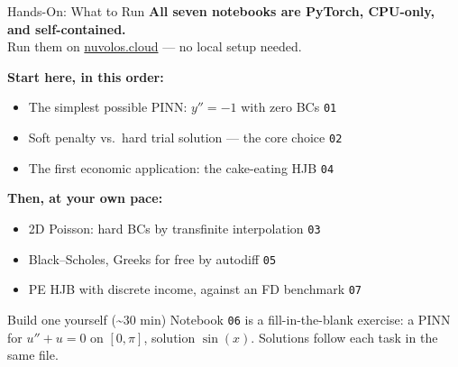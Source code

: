 \documentclass[aspectratio=169,11pt]{beamer}
\begin{document}
\begin{frame}{Hands-On: What to Run}
\textbf{All seven notebooks are PyTorch, CPU-only, and self-contained.}\\[2pt]
{\footnotesize Run them on \href{https://nuvolos.cloud}{nuvolos.cloud} --- no local setup needed.}

\vspace{0.4em}
\textbf{Start here, in this order:}
\begin{itemize}\setlength\itemsep{1pt}
    \item The simplest possible PINN: $y''=-1$ with zero BCs \hfill{\footnotesize\texttt{01}}
    \item Soft penalty vs.\ hard trial solution --- the core choice \hfill{\footnotesize\texttt{02}}
    \item The first economic application: the cake-eating HJB \hfill{\footnotesize\texttt{04}}
\end{itemize}

\vspace{0.3em}
\textbf{Then, at your own pace:}
\begin{itemize}\setlength\itemsep{1pt}
    \item 2D Poisson: hard BCs by transfinite interpolation \hfill{\footnotesize\texttt{03}}
    \item Black--Scholes, Greeks for free by autodiff \hfill{\footnotesize\texttt{05}}
    \item PE HJB with discrete income, against an FD benchmark \hfill{\footnotesize\texttt{07}}
\end{itemize}

\vspace{0.1em}
\begin{exampleblock}{Build one yourself (\textasciitilde30 min)}
\footnotesize
Notebook \texttt{06} is a fill-in-the-blank exercise: a PINN for $u''+u=0$ on $[0,\pi]$, solution $\sin(x)$. Solutions follow each task in the same file.
\end{exampleblock}
\end{frame}
\end{document}
